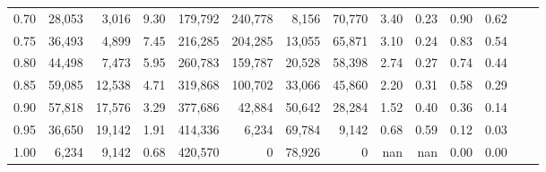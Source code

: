 \begin{tabular}{rrrrrrrrrrrrrr}
0.70 &  28,053 &   3,016 &     9.30 &  179,792 &  240,778 &   8,156 &  70,770 &  3.40 &  0.23 &  0.90 &      0.62 \\
0.75 &  36,493 &   4,899 &     7.45 &  216,285 &  204,285 &  13,055 &  65,871 &  3.10 &  0.24 &  0.83 &      0.54 \\
0.80 &  44,498 &   7,473 &     5.95 &  260,783 &  159,787 &  20,528 &  58,398 &  2.74 &  0.27 &  0.74 &      0.44 \\
0.85 &  59,085 &  12,538 &     4.71 &  319,868 &  100,702 &  33,066 &  45,860 &  2.20 &  0.31 &  0.58 &      0.29 \\
0.90 &  57,818 &  17,576 &     3.29 &  377,686 &   42,884 &  50,642 &  28,284 &  1.52 &  0.40 &  0.36 &      0.14 \\
0.95 &  36,650 &  19,142 &     1.91 &  414,336 &    6,234 &  69,784 &   9,142 &  0.68 &  0.59 &  0.12 &      0.03 \\
1.00 &   6,234 &   9,142 &     0.68 &  420,570 &        0 &  78,926 &       0 &   nan &   nan &  0.00 &      0.00 \\
\bottomrule
\end{tabular}
